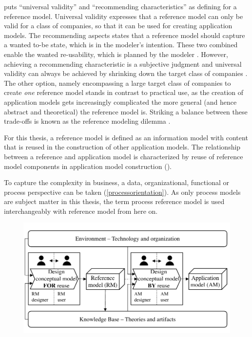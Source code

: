			\citeauthor{Schutte1998} puts \enquote{universal validity} and \enquote{recommending characteristics} as defining  for a reference model. Universal validity expresses that a reference model can only be valid for a class of companies, so that it can be used for creating application models. The recommending aspects states that a reference model should capture a wanted to-be state, which is in the modeler's intention. These two combined enable the wanted re-usability, which is planned by the modeler \citep[]{vombrocke2003referenzmodellierung}. However, achieving a recommending characteristic is a subjective judgment and universal validity can always be achieved by shrinking down the target class of companies \cite{thomas2006a}. The other option, namely encompassing a large target class of companies to create \textit{one} reference model stands in contrast to practical use, as the creation of application models gets increasingly complicated the more general (and hence abstract and theoretical) \citep[]{Schutte1998} the reference model is. Striking a balance between these trade-offs is known as the reference modeling dilemma \cite{delfmann2006adaptive}. 
		
			For this thesis, a reference model is defined as an information model with content that is reused in the construction of other application models. The relationship between a reference and application model is characterized by reuse of reference model components in application model construction (\cf \cite{Puster2015, vombrocke2003referenzmodellierung}). 
			
			To capture the complexity in business, a data, organizational, functional or process perspective can be taken (\cf \ref{processorientation}). As only process models are subject matter in this thesis, the term process reference model is used interchangeably with reference model from here on. 
				  
				  
				  
				  \begin{figure}[caption={Design Process of Reusable Conceptual Models}, label={fig:refmodconst}]
				  	{	\includegraphics[width=.8\textwidth]{figures/refmodconst.pdf}}
				  \end{figure} 
				  
